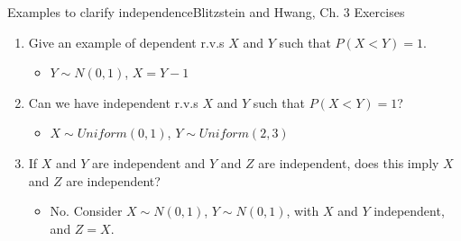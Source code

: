\documentclass{beamer}
\begin{document}
\begin{frame}{Examples to clarify independence}{Blitzstein and Hwang, Ch. 3 Exercises}
\begin{enumerate}
\item Give an example of dependent r.v.s $X$ and $Y$ such that $P(X<Y)=1$.
\begin{itemize}
\item $Y\sim N(0,1)$, $X=Y-1$
\end{itemize}
\item Can we have independent r.v.s $X$ and $Y$ such that $P(X<Y)=1$?
\begin{itemize}
\item $X\sim Uniform(0,1)$, $Y\sim Uniform(2,3)$
\end{itemize}
\item If $X$ and $Y$ are independent and $Y$ and $Z$ are independent, does this imply $X$ and $Z$ are independent?
\begin{itemize}
\item No. Consider $X\sim N(0,1)$, $Y\sim N(0,1)$, with $X$ and $Y$ independent, and $Z=X$.
\end{itemize}
\end{enumerate}
\end{frame}
\end{document}
